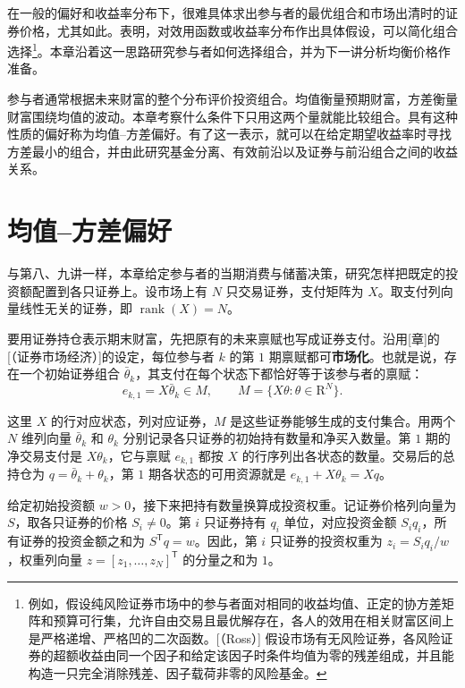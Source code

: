 \ifdefined\WJHandoutKnowledge
在一般的偏好和收益率分布下，很难具体求出参与者的最优组合和市场出清时的证券价格，尤其如此。表明，对效用函数或收益率分布作出具体假设，可以简化组合选择\footnote{例如，假设纯风险证券市场中的参与者面对相同的收益均值、正定的协方差矩阵和预算可行集，允许自由交易且最优解存在，各人的效用在相关财富区间上是严格递增、严格凹的二次函数。[（Ross）] 假设市场有无风险证券，各风险证券的超额收益由同一个因子和给定该因子时条件均值为零的残差组成，并且能构造一只完全消除残差、因子载荷非零的风险基金。}。本章沿着这一思路研究参与者如何选择组合，并为下一讲分析均衡价格作准备。

参与者通常根据未来财富的整个分布评价投资组合。均值衡量预期财富，方差衡量财富围绕均值的波动。本章考察什么条件下只用这两个量就能比较组合。具有这种性质的偏好称为均值--方差偏好。有了这一表示，就可以在给定期望收益率时寻找方差最小的组合，并由此研究基金分离、有效前沿以及证券与前沿组合之间的收益关系。

\section{均值--方差偏好}\label{sec:wj-twelve-1}
与第八、九讲一样，本章给定参与者的当期消费与储蓄决策，研究怎样把既定的投资额配置到各只证券上。设市场上有 $N$ 只交易证券，支付矩阵为 $X$。取支付列向量线性无关的证券，即 $\operatorname{rank}(X)=N$。

要用证券持仓表示期末财富，先把原有的未来禀赋也写成证券支付。沿用[章]的[（证券市场经济）]的设定，每位参与者 $k$ 的第 $1$ 期禀赋都可\textbf{市场化}。也就是说，存在一个初始证券组合 $\bar\theta_k$，其支付在每个状态下都恰好等于该参与者的禀赋：
\[
 e_{k,1}=X\bar\theta_k\in M,\qquad M=\{X\theta:\theta\in\mathrm R^N\}.
\]

这里 $X$ 的行对应状态，列对应证券，$M$ 是这些证券能够生成的支付集合。用两个 $N$ 维列向量 $\bar\theta_k$ 和 $\theta_k$ 分别记录各只证券的初始持有数量和净买入数量。第 $1$ 期的净交易支付是 $X\theta_k$，它与禀赋 $e_{k,1}$ 都按 $X$ 的行序列出各状态的数量。交易后的总持仓为 $q=\bar\theta_k+\theta_k$，第 $1$ 期各状态的可用资源就是 $e_{k,1}+X\theta_k=Xq$。

给定初始投资额 $w>0$，接下来把持有数量换算成投资权重。记证券价格列向量为 $S$，取各只证券的价格 $S_i\ne0$。第 $i$ 只证券持有 $q_i$ 单位，对应投资金额 $S_iq_i$，所有证券的投资金额之和为 $S^{\mathsf T}q=w$。因此，第 $i$ 只证券的投资权重为 $z_i=S_iq_i/w$，权重列向量 $z=[z_1,\ldots,z_N]^{\mathsf T}$ 的分量之和为 $1$。

